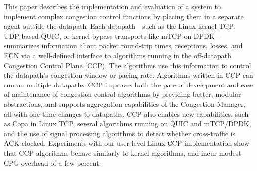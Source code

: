 This paper describes the implementation and evaluation of a system to implement complex congestion control functions by placing them in a separate agent outside the datapath.  
Each datapath---such as the Linux kernel TCP, UDP-based QUIC, or kernel-bypass transports like mTCP-on-DPDK---summarizes information about packet round-trip times, receptions, losses, and ECN via a well-defined interface to algorithms running in the off-datapath Congestion Control Plane (CCP). 
The algorithms use this information to control the datapath's congestion window or pacing rate. Algorithms written in CCP can run on multiple datapaths. CCP improves both the pace of development and ease of maintenance of congestion control algorithms by providing better, modular abstractions, and supports aggregation capabilities of the Congestion Manager, all with one-time changes to datapaths. 
CCP also enables new capabilities, such as Copa in Linux TCP, several algorithms running on QUIC and mTCP/DPDK, and the use of signal processing algorithms to detect whether cross-traffic is ACK-clocked.
Experiments with our user-level Linux CCP implementation show that CCP algorithms behave similarly to kernel algorithms, and incur modest CPU overhead of a few percent.
